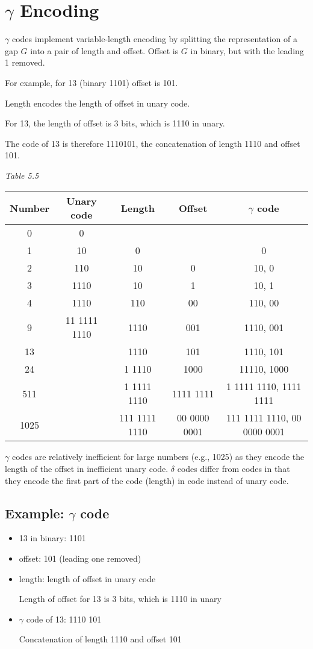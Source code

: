 \documentclass[12pt]{article}
\begin{document}
\section{$\gamma$ Encoding}

$\gamma$ codes implement variable-length encoding by splitting the representation 
of a gap $G$ into a pair of length and offset. 
Offset is $G$ in binary, but with the leading 1 removed. 

For example, for 13 (binary 1101) offset is 101. 

Length encodes the length of offset in unary code. 

For 13, the length of offset is 3 bits, which is 1110 in unary. 

The  code of 13 is therefore 1110101, the concatenation of length 1110 and offset 101. 


\textit{Table 5.5}

\begin{tabular}{|c|c|c|c|c|}
  \hline
  \hline
  Number & Unary code & Length & Offset & $\gamma$ code \\
  \hline
  \hline
  0 & 0 & & &  \\
  1 & 10 & 0 & & 0 \\
  2 & 110 & 10 & 0 & 10, 0 \\
  3 & 1110 & 10 & 1 & 10, 1 \\
  4 & 1110 & 110 & 00 & 110, 00 \\
  9 & 11 1111 1110 & 1110 & 001 & 1110, 001 \\
  13 &  & 1110 & 101 & 1110, 101 \\
  24 &  & 1 1110 & 1000 & 11110, 1000 \\
  511 &  & 1 1111 1110 & 1111 1111 & 1 1111 1110, 1111 1111 \\
  1025 & & 111 1111 1110 & 00 0000 0001 & 111 1111 1110, 00 0000 0001 \\
  \hline
\end{tabular}

$\gamma$ codes are relatively inefficient for large numbers 
(e.g., 1025) as they encode the length of the offset in inefficient unary code. 
$\delta$ codes differ from  codes in that they encode the first part of the code (length) 
in  code instead of unary code. 

\subsection{Example: $\gamma$ code}

\begin{itemize}
  \item 13 in binary: 1101
  \item offset: 101 (leading one removed)
  \item length: length of offset in unary code

	 Length of offset for 13 is 3 bits, which is 1110 in unary
  \item $\gamma$ code of 13: 1110 101

	 Concatenation of length 1110 and offset 101
\end{itemize}
\end{document}

